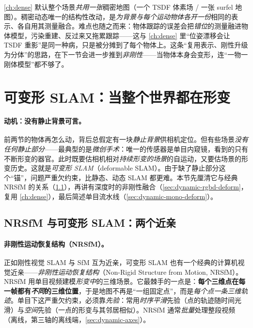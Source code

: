 \begin{insight}[稠密动态 $=$ 把 \cref{ch:dense} 的“一个模型”复制成“一物一模型”]
\cref{ch:dense} 默认整个场景\emph{共用一张}稠密地图（一个 TSDF 体素场 / 一张 surfel 地图）。稠密动态唯一的结构性改动，是\emph{为背景与每个运动物体各开一份}相同的表示、各自用其测量融合。难点也随之而来：物体跟踪的误差会把\emph{错位}的测量融进物体模型，污染重建、反过来又拖累跟踪——这与 \cref{ch:dense} 里“位姿漂移会让 TSDF 重影”是同一种病，只是被分摊到了每个物体上。这条“复用表示、刚性升级为分体”的思路，在下一节会进一步推到\emph{非刚性}——当物体本身会变形，连“一物一刚体模型”都不够了。
\end{insight}

\section{可变形 SLAM：当整个世界都在形变}
\label{sec:dynamic-deformable}

\paragraph{动机：没有静止背景可言。}
前两节的物体再怎么动，背后总假定有一块\emph{静止背景}供相机定位。但有些场景\emph{没有任何静止部分}——最典型的是\emph{微创手术}：唯一的传感器是单目内窥镜，看到的只有不断形变的器官\cite{schmid2026dynamic}。此时既要估相机相对\emph{持续形变的场景}的自运动，又要估场景的形变历史。这就是\emph{可变形 SLAM}（deformable SLAM）。由于缺了静止部分这个“锚”，问题严重欠约束，比静态、动态 SLAM 都更难。本节先厘清它与经典 NRSfM 的关系（\cref{sec:dynamic-nrsfm}），再讲有深度时的非刚性融合（\cref{sec:dynamic-rgbd-deform}，复用 \cref{ch:dense}），最后简述单目流水线（\cref{sec:dynamic-mono-deform}）。

\subsection{NRSfM 与可变形 SLAM：两个近亲}
\label{sec:dynamic-nrsfm}

\paragraph{非刚性运动恢复结构（NRSfM）。}
正如刚性视觉 SLAM 与 SfM 互为近亲，可变形 SLAM 也有一个经典的计算机视觉近亲——\emph{非刚性运动恢复结构}（Non-Rigid Structure from Motion, NRSfM）\cite{schmid2026dynamic}。NRSfM 用单目视频建模\emph{形变中}的三维场景。它最棘手的一点是：\textbf{每个三维点在每一帧都有\emph{不同}的三维位置}，于是地图不再是“一组固定点”，而是\emph{每个点一条三维轨迹}。单目下这严重欠约束，必须靠\emph{先验}：常用\emph{时序平滑}先验（点的轨迹随时间光滑）与\emph{空间}先验（一点的形变与其邻居相似）。NRSfM 通常\emph{批量}处理整段视频（离线，第三轴的离线端，\cref{sec:dynamic-axes}）。

